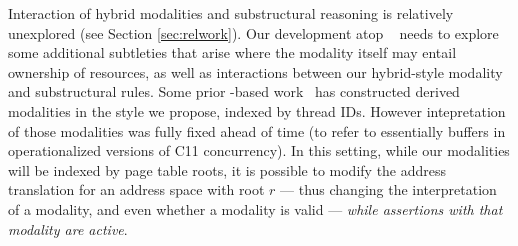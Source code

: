 Interaction of hybrid modalities and substructural reasoning is relatively unexplored (see Section \ref{sec:relwork}).
Our development atop \iris~\cite{jung2018iris} needs to explore some additional subtleties 
that arise where the modality itself may entail ownership of resources, 
as well as interactions between our hybrid-style 
modality and substructural rules.  
Some prior \iris-based work~\cite{dang2019rustbelt,dang2022compass} has constructed derived modalities in the style we propose, indexed
by thread IDs. However  intepretation of those modalities was fully fixed ahead of time (to refer to essentially buffers in operationalized versions of C11
concurrency). In this setting, while our modalities will be indexed by page table roots, it is possible to modify the address translation for an address
space with root $r$ --- thus changing the interpretation of a modality, and even whether a modality is valid --- \emph{while assertions with that modality are active}.
